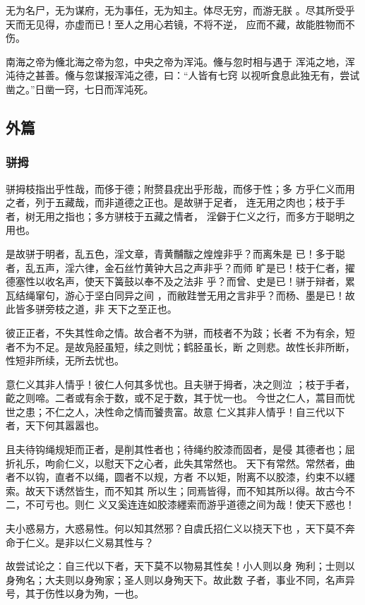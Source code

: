 \documentclass[]{article}
\begin{document}
无为名尸，无为谋府，无为事任，无为知主。体尽无穷，而游无朕
。尽其所受乎天而无见得，亦虚而已！至人之用心若镜，不将不逆，
应而不藏，故能胜物而不伤。

南海之帝为儵北海之帝为忽，中央之帝为浑沌。儵与忽时相与遇于
浑沌之地，浑沌待之甚善。儵与忽谋报浑沌之德，曰：``人皆有七窍
以视听食息此独无有，尝试凿之。''日凿一窍，七日而浑沌死。

\hypertarget{header-n2087}{%
\subsection{外篇}\label{header-n2087}}

\hypertarget{header-n2088}{%
\subsubsection{骈拇}\label{header-n2088}}

骈拇枝指出乎性哉，而侈于德；附赘县疣出乎形哉，而侈于性；多
方乎仁义而用之者，列于五藏哉，而非道德之正也。是故骈于足者，
连无用之肉也；枝于手者，树无用之指也；多方骈枝于五藏之情者，
淫僻于仁义之行，而多方于聪明之用也。

是故骈于明者，乱五色，淫文章，青黄黼黻之煌煌非乎？而离朱是
已！多于聪者，乱五声，淫六律，金石丝竹黄钟大吕之声非乎？而师
旷是已！枝于仁者，擢德塞性以收名声，使天下簧鼓以奉不及之法非
乎？而曾、史是已！骈于辩者，累瓦结绳窜句，游心于坚白同异之间
，而敝跬誉无用之言非乎？而杨、墨是已！故此皆多骈旁枝之道，非
天下之至正也。

彼正正者，不失其性命之情。故合者不为骈，而枝者不为跂；长者
不为有余，短者不为不足。是故凫胫虽短，续之则忧；鹤胫虽长，断
之则悲。故性长非所断，性短非所续，无所去忧也。

意仁义其非人情乎！彼仁人何其多忧也。且夫骈于拇者，决之则泣
；枝于手者，齕之则啼。二者或有余于数，或不足于数，其于忧一也。
今世之仁人，蒿目而忧世之患；不仁之人，决性命之情而饕贵富。故意
仁义其非人情乎！自三代以下者，天下何其嚣嚣也。

且夫待钩绳规矩而正者，是削其性者也；待绳约胶漆而固者，是侵
其德者也；屈折礼乐，呴俞仁义，以慰天下之心者，此失其常然也。
天下有常然。常然者，曲者不以钩，直者不以绳，圆者不以规，方者
不以矩，附离不以胶漆，约束不以纆索。故天下诱然皆生，而不知其
所以生；同焉皆得，而不知其所以得。故古今不二，不可亏也。则仁
义又奚连连如胶漆纆索而游乎道德之间为哉！使天下惑也！

夫小惑易方，大惑易性。何以知其然邪？自虞氏招仁义以挠天下也
，天下莫不奔命于仁义。是非以仁义易其性与？

故尝试论之：自三代以下者，天下莫不以物易其性矣！小人则以身
殉利；士则以身殉名；大夫则以身殉家；圣人则以身殉天下。故此数
子者，事业不同，名声异号，其于伤性以身为殉，一也。
\end{document}

